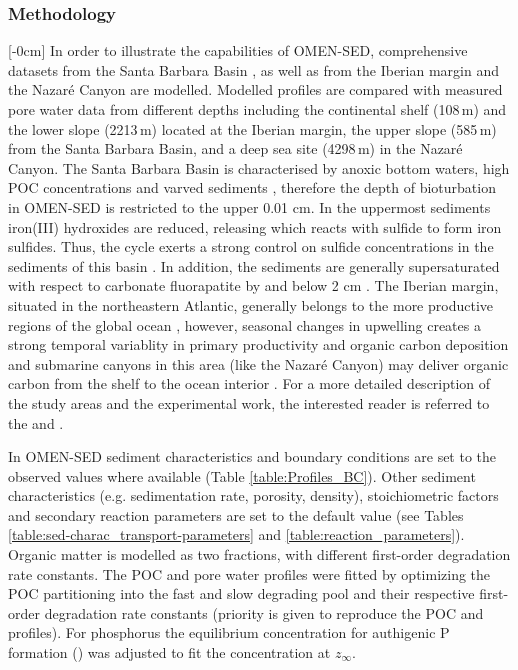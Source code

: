 \documentclass[gmd, manuscript]{copernicus}
\begin{document}
\subsubsection{Methodology}
[-0cm]%
In order to illustrate the capabilities of OMEN-SED, comprehensive datasets from the Santa Barbara Basin \citep{reimers_porewater_1996}, as well as from the Iberian margin and the Nazar\'e Canyon \citep{epping_oxidation_2002} 
are modelled. Modelled profiles are compared with measured pore water data from different depths including the continental shelf (108\,m) and the lower slope (2213\,m) located at the Iberian margin,
the upper slope (585\,m) from the Santa Barbara Basin, and a deep sea site (4298\,m) in the Nazar\'e Canyon. 
The Santa Barbara Basin is characterised by anoxic bottom waters, high POC concentrations and varved sediments \citep{reimers_seasonal_1990}, therefore the depth of bioturbation in OMEN-SED 
is restricted to the upper 0.01 cm. In the uppermost sediments iron(III) hydroxides are reduced, releasing  which reacts with sulfide to form iron sulfides. 
Thus, the  cycle exerts a strong control on sulfide concentrations in the sediments of this basin \citep{reimers_porewater_1996}. 
In addition, the sediments are generally supersaturated with respect to carbonate fluorapatite by and below 2 cm \citep{reimers_porewater_1996}. 
The Iberian margin, situated in the northeastern Atlantic, generally belongs to the more productive regions of the global ocean \citep{longhurst_estimate_1995}, however, seasonal changes in upwelling creates a strong temporal variablity in 
primary productivity and organic carbon deposition and submarine canyons in this area (like the Nazar\'e Canyon) may deliver organic carbon from the shelf to the ocean interior \citep{van_weering_recent_2002, epping_oxidation_2002}.
For a more detailed description of the study areas and the experimental work, the interested reader is referred to the \citet{reimers_porewater_1996} and \citet{epping_oxidation_2002}. 

In OMEN-SED sediment characteristics and boundary conditions are set to the observed values where available (Table \ref{table:Profiles_BC}). Other sediment characteristics (e.g. sedimentation rate, porosity, density), 
stoichiometric factors and secondary reaction parameters are set to the default value (see Tables \ref{table:sed-charac_transport-parameters} and \ref{table:reaction_parameters}).
Organic matter is modelled as two fractions, with different first-order degradation rate constants. 
The POC and pore water profiles were fitted by optimizing the POC partitioning into the fast and slow degrading pool and their respective first-order degradation rate constants (priority is given to reproduce the POC 
and  profiles). For phosphorus the equilibrium concentration for authigenic P formation () was adjusted to fit the  concentration at $z_\infty$. 
\end{document}
